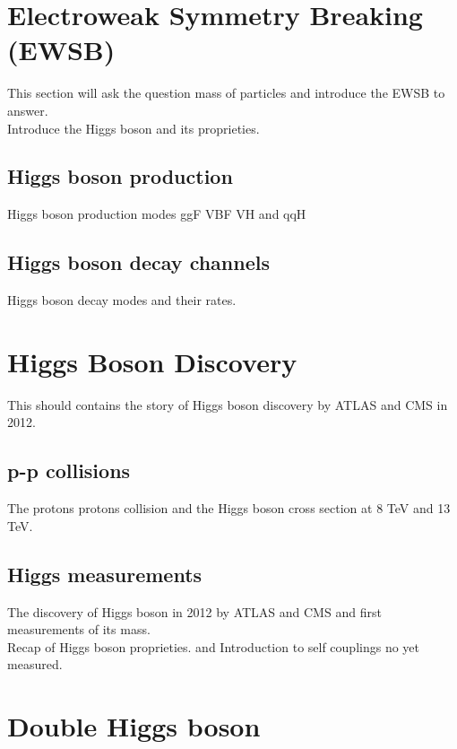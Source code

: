 \section{Electroweak Symmetry Breaking (EWSB)}
\label{chap1:EWSB}


This section will ask the question mass of particles and introduce the EWSB to answer.\\
Introduce the Higgs boson and its proprieties.\\

\subsection{Higgs boson production}
\label{chap1:EWSB:HP}

Higgs boson production modes ggF VBF VH and qqH

\subsection{Higgs boson decay channels}
\label{chap1:EWSB:HD}

Higgs boson decay modes and their rates.

\section{Higgs Boson Discovery}
\label{chap1:H2012}

This should contains the story of Higgs boson discovery by ATLAS and CMS in 2012.

\subsection{p-p collisions}
\label{chap1:H2012:PP}

The protons protons collision and the Higgs boson cross section at 8 TeV and 13 TeV.

\subsection{Higgs measurements}
\label{chap1:H2012:HM}

The discovery of Higgs boson in 2012 by ATLAS and CMS and first measurements of its mass.\\
Recap of Higgs boson proprieties. and Introduction to self couplings no yet measured.

\section{Double Higgs boson}
\label{chap1:HH}

